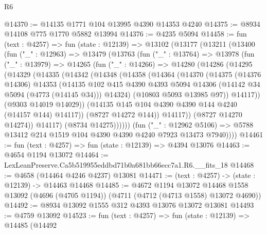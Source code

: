 \begin{lexlean}{R6}
\begin{coremodule}
@14370 := @14135 @1771 @104 @13995 @4390 @14353 @4240
@14375 := @8934 @14108 @775 @1770 @5882 @13994
@14376 := @4235 @5094
@14458 := fun (text : @4257) =>
  fun (state : @12139) =>
  @13102
    (@13177
      (@13211
        (@13400
          (fun ("_" : @12963) =>
          @13479
            (@13763
              (fun ("_" : @13764) =>
              @13978
                (fun ("_" : @13979) =>
                @14265
                  (fun ("_" : @14266) =>
                  @14280
                    (@14286
                      (@14295
                        (@14329
                          (@14335
                            (@14342
                              (@14348
                                (@14358
                                  (@14364
                                    (@14370
                                      (@14375
                                        (@14376 @14306)
                                        @14353
                                        (@14135
                                          @102
                                          @415
                                          @4390
                                          @4393
                                          @5094
                                          @14306
                                          (@14142 @34 @5094 (@4773 (@14145 @34)))
                                          @14324)
                                        (@10803 @5093 @13985 @97))
                                      @14117))
                                  (@9303 @14019 @14029))
                                (@14135 @145 @104 @4390 @4390 @144 @4240 (@14157 @144) @14117))
                              (@8727 @14272 @144))
                            @14117))
                        (@8727 @14270 @14274))
                      @14117)
                    (@8734 @14275))))))
          (fun ("_" : @12962 @5106) =>
          @5788 @13412 @214 @1519 @104 @4390 @4390 @4240 @7923 @13473 @7940))))
@14461 := fun (text : @4257) => fun (state : @12139) => @4394 @13076
@14463 := @4654 @1194 @13072
@14464 := LexLeanPreserve.Ca5b519955eddbd71b0a681bb66ecc7a1.R6.__fits_18
@14468 := @4658 (@14464 @4246 @4237) @13081
@14471 := (text : @4257) -> (state : @12139) -> @14463 @14468
@14485 := @4672
    @1194
    @13072
    @14468
    @1558
    @13092
    (@4696 (@4705 @1194))
    (@4711 (@4712 (@4713 @1558) @13072 @4690))
@14492 := @8934 @13092 @1555 @312 @4393 @13076 @13072 @13081
@14493 := @4759 @13092
@14523 := fun (text : @4257) =>
  fun (state : @12139) =>
  @14485
    (@14492

\end{coremodule}
\end{lexlean}
